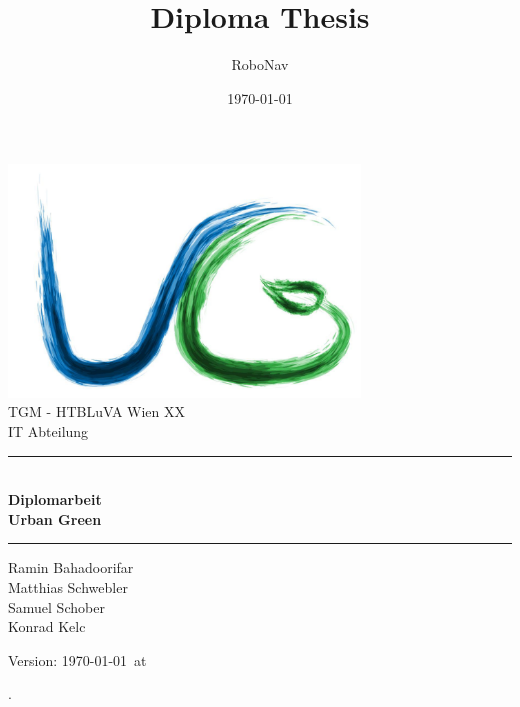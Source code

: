 \documentclass[12pt]{article}
\title{Diploma Thesis}
\author{RoboNav}
\date{\today}
\begin{document}
\begin{titlepage}
\begin{center}

\includegraphics[width=0.7\textwidth]{images/logo}\\

\LARGE TGM - HTBLuVA Wien XX \\ IT Abteilung  \\[1.5cm]

\rule{1.0\textwidth}{1mm}
{ \huge \bfseries \\[0.4cm]  \huge Diplomarbeit \\ \LARGE Urban Green \\[0.4cm] }
\rule{1.0\textwidth}{1mm}

{ \huge Ramin Bahadoorifar \\ Matthias Schwebler \\ Samuel Schober \\ Konrad Kelc \\[0.4cm] }



\noindent 


\vfill

{\small Version: \today ~at  \thistime    }
\end{center}

\end{titlepage}


\ohead{\headmark}
\ofoot{\pagemark}

\newpage %
{\small\color{white}.}
\vspace{-0.7cm}
\tableofcontents

\newpage %
%

\newpage

\newpage

\label{pageRomanEnd}
\end{document}
